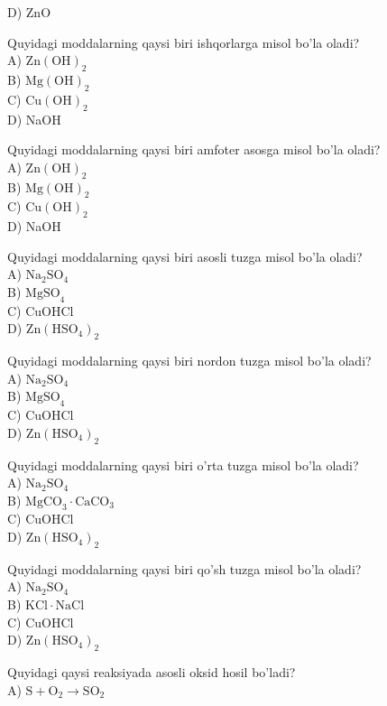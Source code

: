 D) ZnO
  \item Quyidagi moddalarning qaysi biri ishqorlarga misol bo'la oladi?\\
A) $\mathrm{Zn}(\mathrm{OH})_{2}$\\
B) $\mathrm{Mg}(\mathrm{OH})_{2}$\\
C) $\mathrm{Cu}(\mathrm{OH})_{2}$\\
D) NaOH
  \item Quyidagi moddalarning qaysi biri amfoter asosga misol bo'la oladi?\\
A) $\mathrm{Zn}(\mathrm{OH})_{2}$\\
B) $\mathrm{Mg}(\mathrm{OH})_{2}$\\
C) $\mathrm{Cu}(\mathrm{OH})_{2}$\\
D) NaOH
  \item Quyidagi moddalarning qaysi biri asosli tuzga misol bo'la oladi?\\
A) $\mathrm{Na}_{2} \mathrm{SO}_{4}$\\
B) $\mathrm{MgSO}_{4}$\\
C) CuOHCl\\
D) $\mathrm{Zn}\left(\mathrm{HSO}_{4}\right)_{2}$
  \item Quyidagi moddalarning qaysi biri nordon tuzga misol bo'la oladi?\\
A) $\mathrm{Na}_{2} \mathrm{SO}_{4}$\\
B) $\mathrm{MgSO}_{4}$\\
C) CuOHCl\\
D) $\mathrm{Zn}\left(\mathrm{HSO}_{4}\right)_{2}$
  \item Quyidagi moddalarning qaysi biri o'rta tuzga misol bo'la oladi?\\
A) $\mathrm{Na}_{2} \mathrm{SO}_{4}$\\
B) $\mathrm{MgCO}_{3} \cdot \mathrm{CaCO}_{3}$\\
C) CuOHCl\\
D) $\mathrm{Zn}\left(\mathrm{HSO}_{4}\right)_{2}$
  \item Quyidagi moddalarning qaysi biri qo'sh tuzga misol bo'la oladi?\\
A) $\mathrm{Na}_{2} \mathrm{SO}_{4}$\\
B) $\mathrm{KCl} \cdot \mathrm{NaCl}$\\
C) CuOHCl\\
D) $\mathrm{Zn}\left(\mathrm{HSO}_{4}\right)_{2}$
  \item Quyidagi qaysi reaksiyada asosli oksid hosil bo'ladi?\\
A) $\mathrm{S}+\mathrm{O}_{2} \rightarrow \mathrm{SO}_{2}$\\
